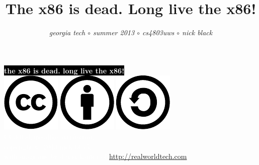\documentclass[mathserif,xcolor={dvipsnames,table}]{beamer}
\title{\textbf{The x86 is dead. Long live the x86!}}
\date{}
\author{\textit{georgia tech $\circ$ summer 2013 $\circ$ cs4803uws $\circ$ nick black}}
\begin{document}
{
%
\begin{frame}[plain]
\textcolor{white}{
%
\colorbox{black}{\textbf{the x86 is dead. long live the x86!}}
}
\vspace{2.7in}
\\
\hfill\includegraphics[scale=.25]{images/cc-logo.pdf}
\includegraphics[scale=.25]{images/cc-new.pdf}
\includegraphics[scale=.25]{images/cc-share.pdf}
\textcolor{white}{
\\
\hfill \tiny{CC3.0 share-alike attribution}\\
}
\textcolor{white}{
\hfill \scriptsize{copyright \copyright\ 2013 nick black}\\
}
\vspace{.6cm}
\textcolor{white}{
\hfill\tiny{with diagrams by david kanter of \href{http://realworldtech.com}{http://realworldtech.com}}
}
\end{frame}
}
\end{document}
